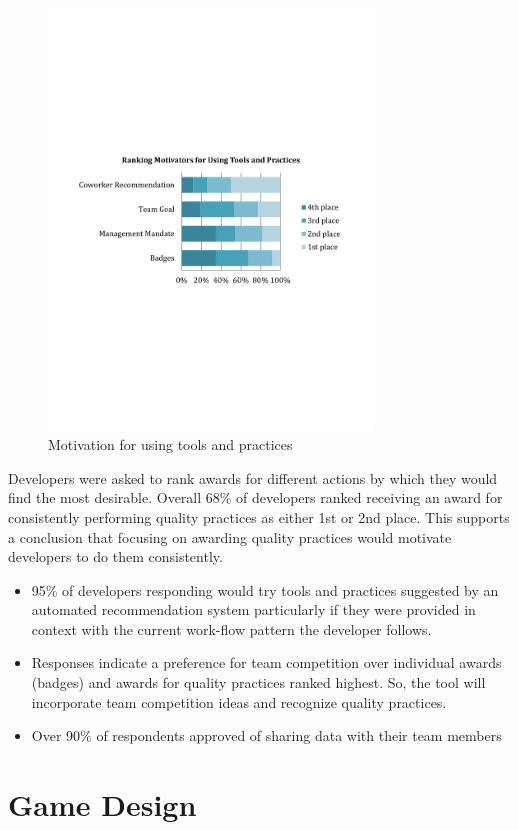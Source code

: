 \documentclass{sig-alternate}
\begin{document}
\begin{figure}
	\includegraphics[width=3.4in]{ToolAndPracticeMotivators.pdf}
	\caption{Motivation for using tools and practices}
	\label{fig:toolandpracticemotivators}
\end{figure}

Developers were asked to rank awards for different actions by which they would find the most desirable.  Overall 68\% of developers ranked receiving an award for consistently performing quality practices as either 1st or 2nd place.  This supports a conclusion that focusing on awarding quality practices would motivate developers to do them consistently.
\begin{itemize}
\item 95\% of developers responding would try tools and practices suggested by an automated recommendation system particularly if they were provided in context with the current work-flow pattern the developer follows.
\item Responses indicate a preference for team competition over individual awards (badges) and awards for quality practices ranked highest.  So, the tool will incorporate team competition ideas and recognize quality practices.
\item Over 90\% of respondents approved of sharing data with their team members
\end{itemize}



\section{Game Design}
\end{document}
